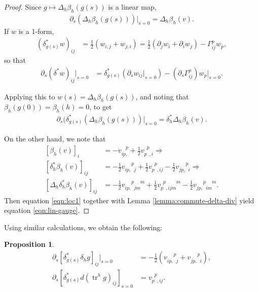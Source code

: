 \documentclass[10pt,reqno]{amsart}
\newtheorem{prop}[theorem]{Proposition}
\DeclareMathOperator{\tr}{tr}
\newcommand{\vddu}[3]{v_{#1#2,}^{\phantom{#1#2}#3}}
\newcommand{\vdud}[3]{v_{#1\phantom{#2},#3}^{\phantom{#1}#2}}
\newcommand{\vddud}[4]{v_{#1 #2, \phantom{#3} #4}^{\phantom{#1#2,} #3 \phantom{#4}}}
\newcommand{\vdudd}[4]{v_{#1 \phantom{#2}, #3 #4}^{\phantom{#1} #2 \phantom{, #3 #4}}}
\newcommand{\vdduddu}[6]{v_{#1#2,\phantom{#3}#4#5\phantom{#6}}^{\phantom{#1#2,}#3\phantom{#4#5}#6}}
\newcommand{\vdudddu}[6]{v_{#1\phantom{#2},#3#4#5\phantom{#6}}^{\phantom{#1}#2\phantom{,#3#4#5}#6}}
\begin{document}
\begin{proof}
Since $g \longmapsto \Delta_h \beta_h (g(s))$ is a linear map, 
\begin{align*}
\partial_s ( \Delta_h \beta_h (g(s)) )|_{s=0} = \Delta_h \beta_h ( v ).
\end{align*}
If $w$ is a 1-form,  
\begin{align*}
(\delta^*_{g(s)} w)_{ij} &= \frac{1}{2} (w_{i,j} + w_{j,i}) = \frac{1}{2} (\partial_j w_{i} + \partial_i w_{j}) - \Gamma_{ij}^p w_p,
\end{align*}
so that 
\begin{align} \label{eqn:var-delstar}
\partial_s (\delta^* w)_{ij} |_{s=0} &= \delta_{g(s)}^* \left(\partial_s w_{ij} |_{s=0}\right) - (\partial_s \Gamma_{ij}^p)  w_p|_{s=0}.
\end{align}
	
Applying this to $w(s) = \Delta_h \beta_h (g(s))$, and noting that $\beta_h( g(0)) = \beta_h(h) = 0$, to get
\begin{align} \label{eqn:loc1}
\partial_s  ( \delta_{g(s)}^* ( \Delta_h \beta_h (g(s)) )|_{s=0} = \delta_h^* \Delta_h \beta_h(v).
\end{align}
	
On the other hand, we note that
\begin{equation*}
\begin{split}
[\beta_h(v)]_{i} & = - \vddu{i}{p}{p} + \frac{1}{2}  \vdud{p}{p}{i} \Longrightarrow \\
[\delta_h^* \beta_h(v)]_{ij} &=
 -\frac{1}{2} \vddud{i}{p}{p}{j} + \frac{1}{2} \vdudd{p}{p}{i}{j} -\frac{1}{2}  \vddud{j}{p}{p}{i} \Longrightarrow \\
[\Delta_h \delta_h^* \beta_h(v)]_{ij} &= -\frac{1}{2}  \vdduddu{i}{p}{p}{j}{m}{m} + \frac{1}{2} \vdudddu{p}{p}{i}{j}{m}{m}-\frac{1}{2} \vdduddu{j}{p}{p}{i}{m}{m}.
\end{split}
\end{equation*}
Then equation \eqref{eqn:loc1} together with Lemma \ref{lemma:commute-delta-div} yield equation \eqref{eqn:lin-gauge}.
\end{proof}

Using similar calculations, we obtain the following: 

\begin{prop}
\begin{align*}
\partial_s [ \delta_{g(s)}^* \delta_h g ]_{ij}|_{s=0} &= -\frac{1}{2} ( \vddud{i}{p}{p}{j} + \vddud{j}{p}{p}{i} ),\\
\partial_s [ \delta_{g(s)}^* d (\tr^h g)_{ij} ]_{s=0} &= \vdudd{p}{p}{i}{j}.
\end{align*}
\end{prop}
\end{document}
